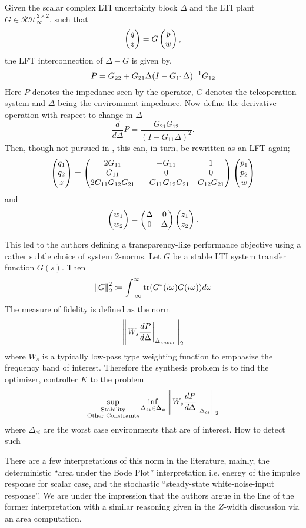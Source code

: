 Given the scalar complex LTI uncertainty block $\Delta$ and the LTI plant $G\in\mathcal{RH}_\infty^{2\times 2}$, 
such that 
\[
\begin{pmatrix}q\\z\end{pmatrix} = G\begin{pmatrix}p\\w\end{pmatrix},
\]
the LFT interconnection of $\Delta-G$ is given by, 
\[
P = G_{22}+G_{21}\Delta(I-G_{11}\Delta)^{-1}G_{12}
\]
Here $P$ denotes the impedance seen by the operator, $G$ denotes the teleoperation system and $\Delta$ being the 
environment impedance. Now define the derivative operation with respect to change in $\Delta$
\[
\frac{d}{d\Delta} P = \frac{G_{21}G_{12}}{(I-G_{11}\Delta)^2}.
\]
Then, though not pursued in \cite{cavusoglu}, this can, in turn, be rewritten as an LFT again;
\[
\begin{pmatrix}q_1\\q_2\\z\end{pmatrix} = \begin{pmatrix}2G_{11} &-G_{11} &1\\G_{11} &0 &0\\ 2G_{11}G_{12}G_{21} &-G_{11}G_{12}G_{21} &G_{12}G_{21}\end{pmatrix}\begin{pmatrix}p_1\\p_2\\w\end{pmatrix}
\]
and 
\[
\begin{pmatrix}w_1\\w_2\end{pmatrix} = \begin{pmatrix}\Delta &0\\0 &\Delta\end{pmatrix}\begin{pmatrix}z_1\\z_2\end{pmatrix}.
\]


This led to the authors defining a transparency-like performance objective using a rather subtle choice of system 
$2$-norms. Let $G$ be a stable LTI system transfer function $G(s)$. Then 
\[
\displaystyle \left\| G \right\|_2^2 \coloneqq \int_{-\infty}^\infty{\operatorname{tr}(G^*(i\omega)G(i\omega))}d\omega
\] 
The measure of fidelity is defined as the norm
\[
\displaystyle \left\| \left.W_s\frac{dP}{d\Delta}\right|_{\Delta_{enom}} \right\|_2
\]
where $W_s$ is a typically low-pass type weighting function to emphasize the frequency band of interest. Therefore
the synthesis problem is to find the optimizer, controller $K$ to the problem
\[
\sup_{\substack{\text{Stability}\\\text{Other Constraints}}}\inf_{\Delta_{ei}\in\bm{\Delta_e}}
\displaystyle \left\| \left.W_s\frac{dP}{d\Delta}\right|_{\Delta_{ei}} \right\|_2
\]
where $\Delta_{ei}$ are the worst case environments that are of interest. How to detect such 



There are a few interpretations of this norm in the literature, mainly, the deterministic \enquote{area under the Bode
Plot} interpretation i.e. energy of the impulse response for scalar case, and the stochastic \enquote{steady-state 
white-noise-input response}. We are under the impression that the authors argue in the line of the former interpretation
with a similar reasoning given in the $Z$-width discussion via an area computation. 


